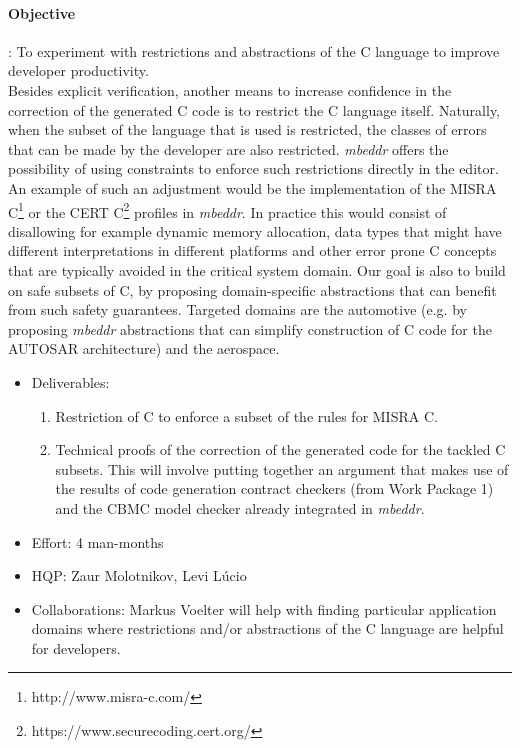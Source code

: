 \paragraph{\textbf{Objective}}: To experiment with restrictions and abstractions
of the C language to improve developer productivity.\vspace{.2cm}\\
Besides explicit verification, another means to increase confidence in the
correction of the generated C code is to restrict the C language itself.
Naturally, when the subset of the language that is used is restricted, the
classes of errors that can be made by the developer are also restricted.
\emph{mbeddr} offers the possibility of using constraints to enforce such
restrictions directly in the editor. An example of such an adjustment would be
the implementation of the MISRA C\footnote{http://www.misra-c.com/} or the CERT
C\footnote{https://www.securecoding.cert.org/} profiles in \emph{mbeddr}.
In practice this would consist of disallowing for example dynamic memory
allocation, data types that might have different interpretations in different
platforms and other error prone C concepts that are typically avoided in the
critical system domain.
Our goal is also to build on safe subsets of C, by proposing domain-specific
abstractions that can benefit from such safety guarantees.
Targeted domains are the automotive (e.g. by proposing \emph{mbeddr} abstractions that can simplify
construction of C code for the AUTOSAR architecture) and the aerospace.

\begin{itemize}
  \item Deliverables:
  \begin{enumerate}
    \item Restriction of C to enforce a subset of the rules for MISRA C.
\item Technical proofs of the correction of the generated code for the tackled C
subsets. This will involve putting together an argument that makes use of the
results of code generation contract checkers (from Work Package 1) and the CBMC
model checker already integrated in \emph{mbeddr}.
  \end{enumerate}
  \item Effort: 4 man-months
  \item HQP: Zaur Molotnikov, Levi L\'ucio
  \item Collaborations: Markus Voelter will help with finding
  particular application domains where restrictions and/or abstractions of the C
  language are helpful for developers.
\end{itemize}